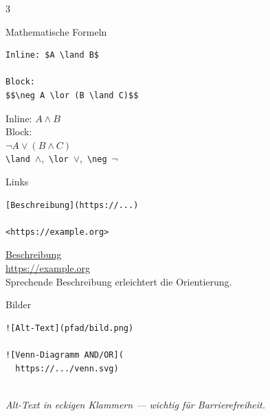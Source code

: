 \documentclass[a4paper,landscape,9pt]{extarticle}
\newcommand{\prevtxt}[1]{{\small #1}}
\begin{document}
\begin{multicols}{3}
\begin{mdcard}{Mathematische Formeln}
\begin{lstlisting}[language=lia]
Inline: $A \land B$

Block:
$$\neg A \lor (B \land C)$$
\end{lstlisting}
\tcblower
\prevtxt{Inline: $A \land B$\\[3pt]
Block:\\
$\displaystyle \neg A \lor (B \land C)$\\[3pt]
{\scriptsize\color{muted}\texttt{\textbackslash land}~$\land$,\,
\texttt{\textbackslash lor}~$\lor$,\,
\texttt{\textbackslash neg}~$\neg$}}
\end{mdcard}


\begin{mdcard}{Links}
\begin{lstlisting}[language=lia]
[Beschreibung](https://...)

<https://example.org>
\end{lstlisting}
\tcblower
\prevtxt{\textcolor{mdblue}{\underline{Beschreibung}}\\[2pt]
\textcolor{mdblue}{\underline{https://example.org}}\\[3pt]
{\scriptsize\color{muted}Sprechende Beschreibung erleichtert die Orientierung.}}
\end{mdcard}

\begin{mdcard}{Bilder}
\begin{lstlisting}[language=lia]
![Alt-Text](pfad/bild.png)

![Venn-Diagramm AND/OR](
  https://.../venn.svg)
\end{lstlisting}
\tcblower
\prevtxt{\fbox{\rule{0pt}{1.2em}\hspace{1.2em}{\scriptsize\color{muted}Bild}\hspace{1.2em}}\\[2pt]
{\scriptsize\color{muted}\textit{Alt-Text in eckigen Klammern — wichtig für Barrierefreiheit.}}}
\end{mdcard}


\end{multicols}
\end{document}
